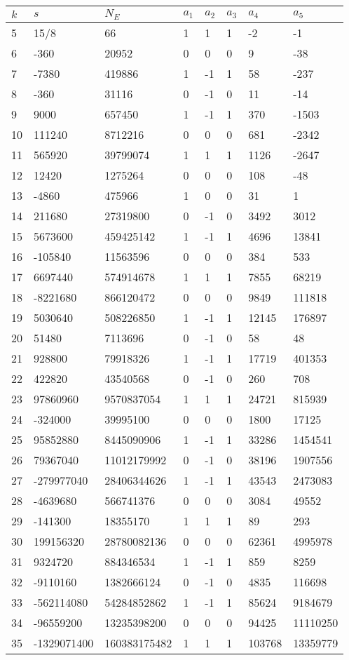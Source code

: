 \documentclass{amsart}
\begin{document}
\begin{longtable}{|l|l|l|lllll|}
\hline
$k$ & $s$ & $N_E$ & $a_1$ & $a_2$ & $a_3$ & $a_4$ & $a_5$\\
\hline
5&15/8&66&1&1&1&-2&-1\\
6&-360&20952&0&0&0&9&-38\\
7&-7380&419886&1&-1&1&58&-237\\
8&-360&31116&0&-1&0&11&-14\\
9&9000&657450&1&-1&1&370&-1503\\
10&111240&8712216&0&0&0&681&-2342\\
11&565920&39799074&1&1&1&1126&-2647\\
12&12420&1275264&0&0&0&108&-48\\
13&-4860&475966&1&0&0&31&1\\
14&211680&27319800&0&-1&0&3492&3012\\
15&5673600&459425142&1&-1&1&4696&13841\\
16&-105840&11563596&0&0&0&384&533\\
17&6697440&574914678&1&1&1&7855&68219\\
18&-8221680&866120472&0&0&0&9849&111818\\
19&5030640&508226850&1&-1&1&12145&176897\\
20&51480&7113696&0&-1&0&58&48\\
21&928800&79918326&1&-1&1&17719&401353\\
22&422820&43540568&0&-1&0&260&708\\
23&97860960&9570837054&1&1&1&24721&815939\\
24&-324000&39995100&0&0&0&1800&17125\\
25&95852880&8445090906&1&-1&1&33286&1454541\\
26&79367040&11012179992&0&-1&0&38196&1907556\\
27&-279977040&28406344626&1&-1&1&43543&2473083\\
28&-4639680&566741376&0&0&0&3084&49552\\
29&-141300&18355170&1&1&1&89&293\\
30&199156320&28780082136&0&0&0&62361&4995978\\
31&9324720&884346534&1&-1&1&859&8259\\
32&-9110160&1382666124&0&-1&0&4835&116698\\
33&-562114080&54284852862&1&-1&1&85624&9184679\\
34&-96559200&13235398200&0&0&0&94425&11110250\\
35&-1329071400&160383175482&1&1&1&103768&13359779\\

\end{longtable}
\end{document}
